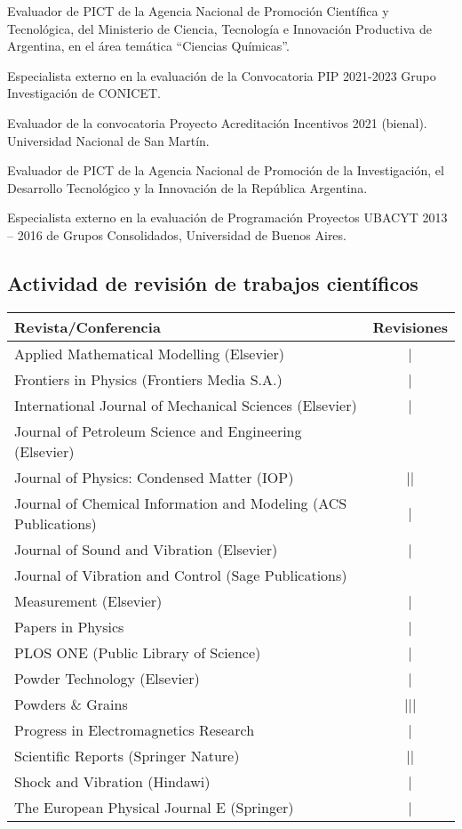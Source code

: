  Evaluador de PICT de la Agencia Nacional de Promoción Científica y Tecnológica, del Ministerio de Ciencia, Tecnología e 
Innovación Productiva de Argentina, en el área temática ``Ciencias Químicas''.

 Especialista externo en la evaluación de la Convocatoria PIP 2021-2023 Grupo Investigación de CONICET.

 Evaluador de la convocatoria Proyecto Acreditación Incentivos 2021 (bienal). Universidad Nacional de San Martín.

 Evaluador de PICT de la Agencia Nacional de Promoción de la Investigación, el Desarrollo Tecnológico y la Innovación de la República Argentina.

 Especialista externo en la evaluación de Programación Proyectos UBACYT 2013 -- 2016 de Grupos Consolidados, Universidad de Buenos Aires.

\subsection{Actividad de revisión de trabajos científicos}
\begin{tabular}{l c}
    \toprule
    \textbf{Revista/Conferencia} & R\textbf{evisiones} \\
    \midrule
    Applied Mathematical Modelling (Elsevier) & | \\ 
    Frontiers in Physics (Frontiers Media S.A.) & | \\
    International Journal of Mechanical Sciences (Elsevier) & | \\
    Journal of Petroleum Science and Engineering (Elsevier) & \cancel{||||} \\
    Journal of Physics: Condensed Matter (IOP) & || \\
    Journal of Chemical Information and Modeling (ACS Publications) & | \\
    Journal of Sound and Vibration (Elsevier) & \cancel{||||} | \\
    Journal of Vibration and Control (Sage Publications) & \cancel{||||} \\
    Measurement (Elsevier) &  | \\
    Papers in Physics & | \\
    PLOS ONE (Public Library of Science) & | \\
    Powder Technology (Elsevier) & | \\
    Powders \& Grains & ||| \\
    Progress in Electromagnetics Research & | \\
    Scientific Reports (Springer Nature) & || \\
    Shock and Vibration (Hindawi) &  | \\
    The European Physical Journal E (Springer) & | \\
    \bottomrule
\end{tabular}

